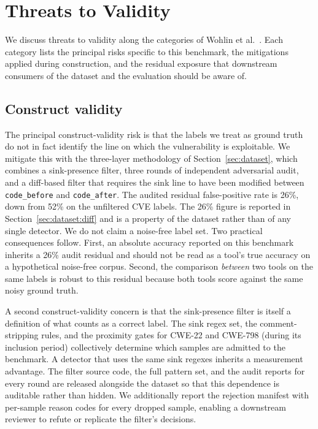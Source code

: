 \section{Threats to Validity}
\label{sec:threats}

We discuss threats to validity along the categories of Wohlin
et al.~\cite{wohlin}. Each category lists the principal risks
specific to this benchmark, the mitigations applied during construction,
and the residual exposure that downstream consumers of the dataset and
the evaluation should be aware of.

\subsection{Construct validity}
\label{sec:threats:construct}

The principal construct-validity risk is that the labels we treat as
ground truth do not in fact identify the line on which the vulnerability
is exploitable. We mitigate this with the three-layer methodology of
Section~\ref{sec:dataset}, which combines a sink-presence filter, three
rounds of independent adversarial audit, and a diff-based filter that
requires the sink line to have been modified between
\texttt{code\_before} and \texttt{code\_after}. The audited residual
false-positive rate is 26\%, down from 52\% on the unfiltered CVE
labels. The 26\% figure is reported in
Section~\ref{sec:dataset:diff} and is a property of the dataset rather
than of any single detector. We do not claim a noise-free label set.
Two practical consequences follow. First, an absolute accuracy reported
on this benchmark inherits a 26\% audit residual and should not be read
as a tool's true accuracy on a hypothetical noise-free corpus. Second,
the comparison \emph{between} two tools on the same labels is robust to
this residual because both tools score against the same noisy ground
truth.

A second construct-validity concern is that the sink-presence filter is
itself a definition of what counts as a correct label. The sink regex
set, the comment-stripping rules, and the proximity gates for CWE-22
and CWE-798 (during its inclusion period) collectively determine which
samples are admitted to the benchmark. A detector that uses the same
sink regexes inherits a measurement advantage. The filter source code,
the full pattern set, and the audit reports for every round are
released alongside the dataset so that this dependence is auditable
rather than hidden. We additionally report the rejection manifest with
per-sample reason codes for every dropped sample, enabling a downstream
reviewer to refute or replicate the filter's decisions.

